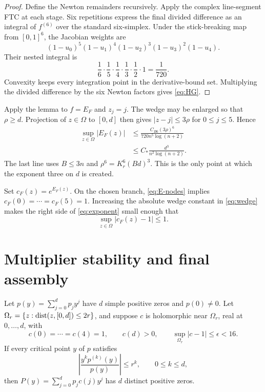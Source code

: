 \documentclass[12pt]{article}
\begin{document}
\begin{proof}
Define the Newton remainders recursively.  Apply the complex line-segment
FTC at each stage.  Six repetitions express the final divided difference as
an integral of $f^{(6)}$ over the standard six-simplex.  Under the
stick-breaking map from $[0,1]^6$, the Jacobian weights are
\[
 (1-u_0)^5(1-u_1)^4(1-u_2)^3(1-u_3)^2(1-u_4).
\]
Their nested integral is
\[
 \frac16\cdot\frac15\cdot\frac14\cdot\frac13\cdot\frac12\cdot1
 =\frac1{720}.
\]
Convexity keeps every integration point in the derivative-bound set.
Multiplying the divided difference by the six Newton factors gives
\eqref{eq:HG}.
\end{proof}

Apply the lemma to $f=E_F$ and $z_j=j$.  The wedge may be enlarged so that
$\rho\ge d$.  Projection of $z\in\Omega$ to $[0,d]$ then gives
$|z-j|\le3\rho$ for $0\le j\le5$.  Hence
\begin{align}
 \sup_{z\in\Omega}|E_F(z)|
 &\le\frac{C_{B6}(3\rho)^6}{720n^5\log(n+2)}\nonumber\\
 &\le C_\ast\frac{d^3}{n^2\log(n+2)}.
 \label{eq:exponent}
\end{align}
The last line uses $B\le3n$ and
$\rho^6=K_r^6(Bd)^3$.  This is the only point at which the exponent three on
$d$ is created.

Set $c_F(z)=e^{E_F(z)}$.  On the chosen branch, \eqref{eq:E-nodes} implies
$c_F(0)=\cdots=c_F(5)=1$.  Increasing the absolute wedge constant in
\eqref{eq:wedge} makes the right side of \eqref{eq:exponent} small enough
that
\begin{equation}\label{eq:multiplier-close}
 \sup_{z\in\Omega}|c_F(z)-1|\le1.
\end{equation}

\section{Multiplier stability and final assembly}\label{sec:assembly}

\begin{lemma}\label{lem:stability}
Let $p(y)=\sum_{j=0}^{d}p_jy^j$ have $d$ simple positive zeros and
$p(0)\ne0$.  Let
$\Omega_r=\{z:\operatorname{dist}(z,[0,d])\le2r\}$, and suppose $c$ is holomorphic near
$\Omega_r$, real at $0,\ldots,d$, with
\[
 c(0)=\cdots=c(4)=1,\qquad c(d)>0,\qquad
 \sup_{\Omega_r}|c-1|\le\epsilon<16.
\]
If every critical point $y$ of $p$ satisfies
\begin{equation}\label{eq:stability-radius}
 \left|\frac{y^kp^{(k)}(y)}{p(y)}\right|\le r^k,
 \qquad0\le k\le d,
\end{equation}
then $P(y)=\sum_{j=0}^{d}p_jc(j)y^j$ has $d$ distinct positive zeros.
\end{lemma}
\end{document}
